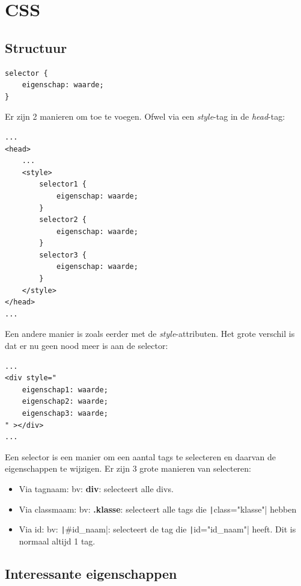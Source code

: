 \section{CSS}%
\label{sec:css}

\subsection{Structuur}%
\label{sub:structuur}

\begin{verbatim}
selector {
    eigenschap: waarde;
}
\end{verbatim}

Er zijn 2 manieren om \CSS toe te voegen. Ofwel via een \emph{style}-tag in de \emph{head}-tag:
\begin{verbatim}
...
<head>
    ...
    <style>
        selector1 {
            eigenschap: waarde;
        }
        selector2 {
            eigenschap: waarde;
        }
        selector3 {
            eigenschap: waarde;
        }
    </style>
</head>
...
\end{verbatim}

Een andere manier is zoals eerder met de \emph{style}-attributen. Het grote verschil is dat er nu geen nood meer is aan de selector:
\begin{verbatim}
...
<div style="
    eigenschap1: waarde;
    eigenschap2: waarde;
    eigenschap3: waarde;
" ></div>
...
\end{verbatim}

Een selector is een manier om een aantal tags te selecteren en daarvan de
eigenschappen te wijzigen. Er zijn 3 grote manieren van selecteren:
\begin{itemize}
    \item Via tagnaam: bv: \textbf{div}: selecteert alle divs.
    \item Via classmaam: bv: \textbf{.klasse}: selecteert alle tags die
        \texttt|class="klasse"| hebben
    \item Via id: bv: \texttt|#id_naam|: selecteert de tag die
        \texttt|id="id_naam"| heeft. Dit is normaal altijd 1 tag.
\end{itemize}

\subsection{Interessante eigenschappen}%
\label{sub:interessante_eigenschappen}

